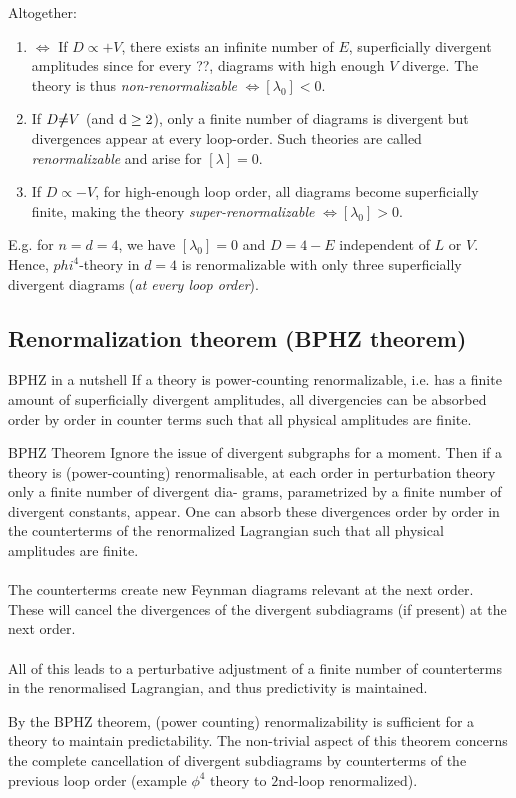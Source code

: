 Altogether:
\begin{enumerate}
	\item $\Leftrightarrow$ If $D\propto + V$, there exists an infinite number of $E$, superficially divergent amplitudes since for every ??, diagrams with high enough $V$ diverge. The theory is thus \emph{non-renormalizable} $\Leftrightarrow [\lambda_0] <0$.
	\item If $D\slashed{\neq} V$ (and $\mathrm{d} \geq 2$), only a finite number of diagrams is divergent but divergences appear at every loop-order. Such theories are called \emph{renormalizable} and arise for $[\lambda]=0$.
	\item If $D \propto -V$, for high-enough loop order, all diagrams become superficially finite, making the theory \emph{super-renormalizable} $\Leftrightarrow [\lambda_0] >0$.
\end{enumerate}
E.g. for $n=d=4$, we have $[\lambda_0 ] =0$ and $D=4-E$ independent of $L$ or $V$. Hence, $phi^4$-theory in $d=4$ is renormalizable with only three superficially divergent diagrams (\emph{at every loop order}).

\subsection{Renormalization theorem (BPHZ theorem)}
\begin{mybox}{BPHZ in a nutshell}
	If a theory is power-counting renormalizable, i.e. has a finite amount of superficially divergent amplitudes, all divergencies can be absorbed order by order in counter terms such that all physical amplitudes are finite.
\end{mybox}
\begin{mybox}{BPHZ Theorem}
	Ignore the issue of divergent subgraphs for a moment. Then if a theory is (power-counting)
	renormalisable, at each order in perturbation theory only a finite number of divergent dia-
	grams, parametrized by a finite number of divergent constants, appear. One can absorb these
	divergences order by order in the counterterms of the renormalized Lagrangian such that all
	physical amplitudes are finite.\\
	\\
	The counterterms create new Feynman diagrams relevant at the next order. These will cancel
	the divergences of the divergent subdiagrams (if present) at the next order.\\
	\\
	All of this leads to a perturbative adjustment of a finite number of counterterms in the renormalised Lagrangian, and thus predictivity is maintained.
\end{mybox}
By the BPHZ theorem, (power counting) renormalizability is sufficient for a theory to maintain predictability. The non-trivial aspect of this theorem concerns the complete cancellation of divergent subdiagrams by counterterms of the previous loop order (example $\phi^4$ theory to $2$nd-loop renormalized).

